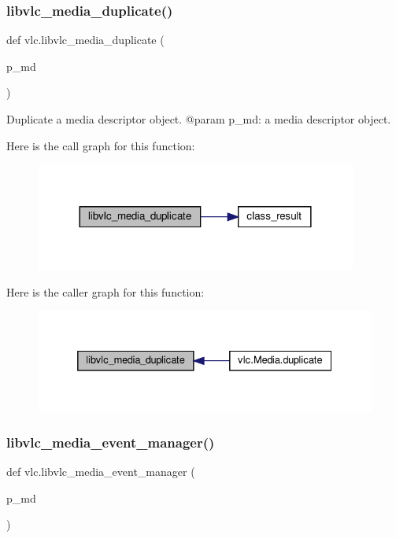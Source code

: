 \subsubsection{\texorpdfstring{libvlc\+\_\+media\+\_\+duplicate()}{libvlc\_media\_duplicate()}}
{\footnotesize\ttfamily def vlc.\+libvlc\+\_\+media\+\_\+duplicate (\begin{DoxyParamCaption}\item[{}]{p\+\_\+md }\end{DoxyParamCaption})}

\begin{DoxyVerb}Duplicate a media descriptor object.
@param p_md: a media descriptor object.
\end{DoxyVerb}
 Here is the call graph for this function\+:
\nopagebreak
\begin{figure}[H]
\begin{center}
\leavevmode
\includegraphics[width=300pt]{namespacevlc_a20f923172a3ea8b7f3c254e234336d7b_cgraph}
\end{center}
\end{figure}
Here is the caller graph for this function\+:
\nopagebreak
\begin{figure}[H]
\begin{center}
\leavevmode
\includegraphics[width=332pt]{namespacevlc_a20f923172a3ea8b7f3c254e234336d7b_icgraph}
\end{center}
\end{figure}
\mbox{\label{namespacevlc_a2b3476422efeca7d595d8371533eaa58}} 
\subsubsection{\texorpdfstring{libvlc\+\_\+media\+\_\+event\+\_\+manager()}{libvlc\_media\_event\_manager()}}
{\footnotesize\ttfamily def vlc.\+libvlc\+\_\+media\+\_\+event\+\_\+manager (\begin{DoxyParamCaption}\item[{}]{p\+\_\+md }\end{DoxyParamCaption})}

